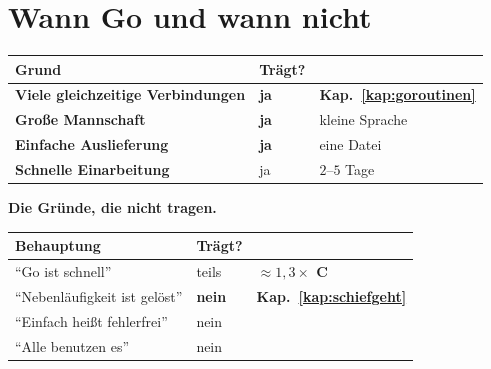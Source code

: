 \chapter{Wann Go und wann nicht}\label{kap:wann}

\begin{merksatz}
\begin{center}
\renewcommand{\arraystretch}{1.5}
\begin{tabular}{@{}P{3.2cm}P{2.0cm}P{2.6cm}@{}}
\toprule
\textbf{Grund} & \textbf{Trägt?} & \\
\midrule
\textbf{Viele gleichzeitige Verbindungen} & \textcolor{gruen}{\textbf{ja}} & \textbf{Kap.~\ref{kap:goroutinen}}\\
\textbf{Große Mannschaft} & \textcolor{gruen}{\textbf{ja}} & \textcolor{gruen}{kleine Sprache}\\
\textbf{Einfache Auslieferung} & \textcolor{gruen}{\textbf{ja}} & eine Datei\\
\textbf{Schnelle Einarbeitung} & \textcolor{gruen}{ja} & $2$--$5$ Tage\\
\bottomrule
\end{tabular}
\end{center}

\begin{center}
\begin{minipage}{0.88\textwidth}
\end{minipage}
\end{center}

\textbf{Die Gründe, die nicht tragen.}

\begin{center}
{\small
\renewcommand{\arraystretch}{1.5}
\begin{tabular}{@{}P{3.2cm}P{2.0cm}P{2.6cm}@{}}
\toprule
\textbf{Behauptung} & \textbf{Trägt?} & \\
\midrule
\enquote{Go ist schnell} & \textcolor{mittel}{teils} & \textbf{$\approx1{,}3\times$ C}\\
\enquote{Nebenläufigkeit ist gelöst} & \textcolor{akzent}{\textbf{nein}} & \textcolor{akzent}{\textbf{Kap.~\ref{kap:schiefgeht}}}\\
\enquote{Einfach heißt fehlerfrei} & \textcolor{akzent}{nein} & \\
\enquote{Alle benutzen es} & \textcolor{akzent}{nein} & \\
\bottomrule
\end{tabular}}
\end{center}

\begin{center}
\end{center}
\end{merksatz}

